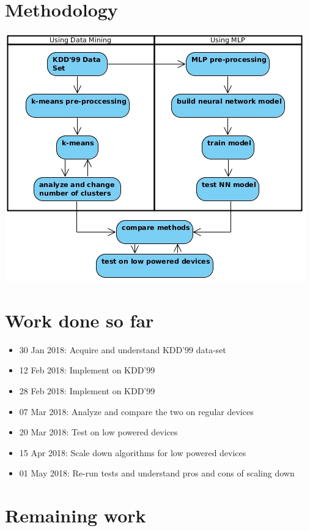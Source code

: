 \documentclass[a4paper,12pt]{article}
\begin{document}
	\section{Methodology}
	\includegraphics{methodology}

	\section{Work done so far}
	\begin{itemize}
		\item 30 Jan 2018: Acquire and understand KDD'99 data-set
		\item 12 Feb 2018: Implement \cite{dm15} on KDD'99
		\item 28 Feb 2018: Implement \cite{mlp17} on KDD'99
		\item 07 Mar 2018: Analyze and compare the two on regular devices
		\item 20 Mar 2018: Test on low powered devices
		\item 15 Apr 2018: Scale down algorithms for low powered devices
		\item 01 May 2018: Re-run tests and understand pros and cons of scaling down
	\end{itemize}

    \section{Remaining work}

	
	
	
\end{document}
